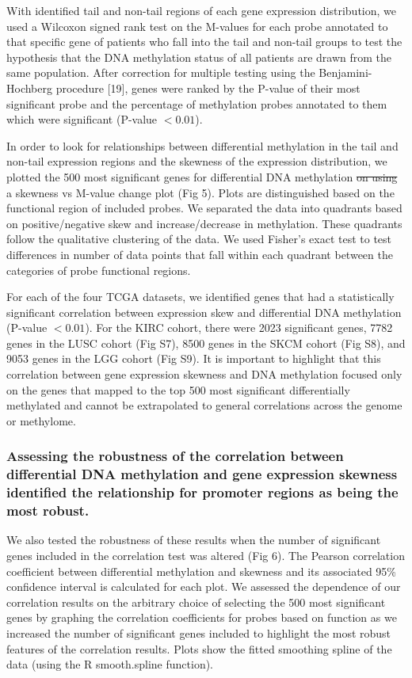 \documentclass[11pt]{article}
\newcommand{\sr}[1]{{\color{red} \st{#1} }}
\newcommand{\rd}[1]{{\color{red}#1}}
\begin{document}
With identified tail and non-tail regions of each gene expression distribution, we used a Wilcoxon signed rank test on the M-values for each probe annotated to that specific gene of patients who fall into the tail and non-tail groups to test the hypothesis that the DNA methylation status of all patients are drawn from the same population. After correction for multiple testing using the Benjamini-Hochberg procedure [19], genes were ranked by the P-value of their most significant probe and the percentage of methylation probes annotated to them which were significant (P-value $< 0.01$). 
\newline

In order to look for relationships between differential methylation in the tail and non-tail expression regions and the skewness of the expression distribution, \rd{we} plotted the 500 most significant genes \rd{for differential DNA methylation} \sr{on using} a skewness vs M-value change plot (Fig 5). Plots are distinguished based on the functional region of included probes. We separated the data into quadrants based on positive/negative skew and increase/decrease in methylation. These quadrants follow the qualitative clustering of the data. We used Fisher’s exact test to test differences in number of data points that fall within each quadrant between the categories of probe functional regions.
\newline

For each of the four TCGA datasets, we identified genes that had a statistically significant correlation between expression skew and differential DNA methylation (P-value $< 0.01$). For the KIRC cohort, there were 2023 significant genes, 7782 genes in the LUSC cohort (Fig S7), 8500 genes in the SKCM cohort (Fig S8), and 9053 genes in the LGG cohort (Fig S9). \rd{It is important to highlight that this correlation between gene expression skewness and DNA methylation focused only on the genes that mapped to the top 500 most significant differentially methylated and cannot be extrapolated to general correlations across the genome or methylome.}

\subsubsection*{Assessing the robustness of the correlation between differential DNA methylation and gene expression skewness identified the relationship for promoter regions as being the most robust.}

We also tested the robustness of these results when the number of significant genes included in the correlation test was altered (Fig 6). The Pearson correlation coefficient between differential methylation and skewness and its associated 95\% confidence interval is calculated for each plot. We assessed the dependence of our correlation results on the arbitrary choice of selecting the 500 most significant genes by graphing the correlation coefficients for probes based on function as we increased the number of significant genes included to highlight the most robust features of the correlation results. Plots show the fitted smoothing spline of the data (using the R smooth.spline function).
\newline
\end{document}
